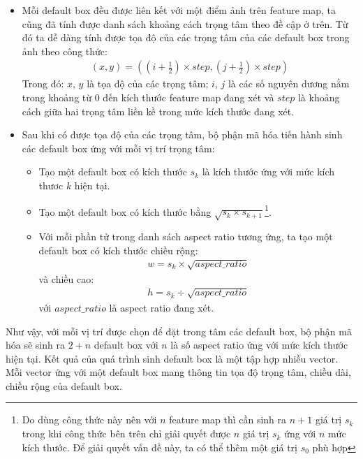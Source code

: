 \documentclass[a4paper]{article}
\theoremstyle{definition}
\begin{document}
	\begin{itemize}
		
		\item Mỗi default box đều được liên kết với một điểm ảnh trên feature map, ta cũng đã tính được danh sách khoảng cách trọng tâm theo đề cập ở trên. Từ đó ta dễ dàng tính được tọa độ của các trọng tâm của các default box trong ảnh theo công thức:
		\begin{align}
		(x, y) =\left( \left(i + \frac{1}{2} \right) \times step, \left(j + \frac{1}{2} \right) \times step \right)
		\end{align}
		Trong đó: $x$, $y$ là tọa độ của các trọng tâm; $i$, $j$ là các số nguyên dương nằm trong khoảng từ 0 đến kích thước feature map đang xét và $step$ là khoảng cách giữa hai trọng tâm liền kề trong mức kích thước đang xét.
		
		\item Sau khi có được tọa độ của các trọng tâm, bộ phận mã hóa tiến hành sinh các default box ứng với mỗi vị trí trọng tâm: 
		
		\begin{itemize}
			\item Tạo một default box có kích thước $s_k$ là kích thước ứng với mức kích thươc $k$ hiện tại.
			\item Tạo một default box có kích thước bằng $\sqrt{s_k \times s_{k + 1}}$\footnote{Do dùng công thức này nên với $n$ feature map thì cần sinh ra $n + 1$ giá trị $s_k$ trong khi công thức bên trên chỉ giải quyết được $n$ giá trị $s_k$ ứng với $n$ mức kích thước. Để giải quyết vấn đề này, ta có thể thêm một giá trị $s_0$ phù hợp}.
			\item Với mỗi phần tử trong danh sách aspect ratio tương ứng, ta tạo một default box có kích thước chiều rộng: 
			\begin{align}
			w = s_k \times \sqrt{aspect\_ratio}
			\end{align} 
			và chiều cao:
			\begin{align}
			h = s_k \div \sqrt{aspect\_ratio}
			\end{align}
			với $aspect\_ratio$ là aspect ratio đang xét.
		\end{itemize}
		
	\end{itemize}
	
	Như vậy, với mỗi vị trí được chọn để đặt trong tâm các default box, bộ phận mã hóa sẽ sinh ra $2 + n$ default box với $n$ là số aspect ratio ứng với mức kích thước hiện tại. Kết quả của quá trình sinh default box là một tập hợp nhiều vector. Mỗi vector ứng với một default box mang thông tin tọa độ trọng tâm, chiều dài, chiều rộng của default box.
	
\end{document}

